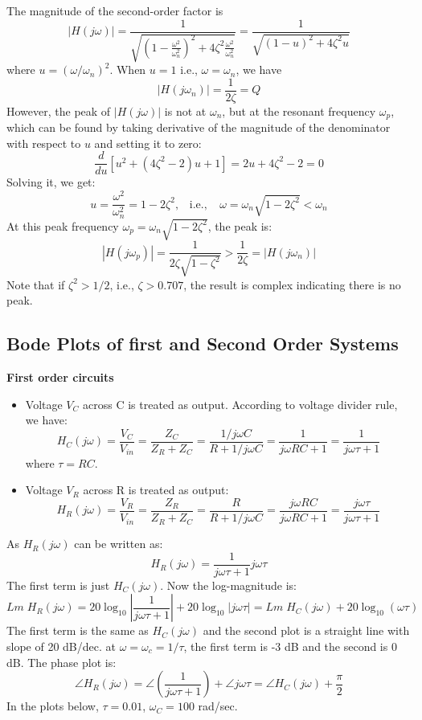 
  The magnitude of the second-order factor is
  \[ |H(j\omega)|
  =\frac{1}{\sqrt{(1-\frac{\omega^2}{\omega_n^2})^2+4\zeta^2 \frac{\omega^2}{\omega_n^2}}}
  =\frac{1}{\sqrt{(1-u)^2+4\zeta^2 u}} \]
  where $u=(\omega/\omega_n)^2$. When $u=1$ i.e., $\omega=\omega_n$, we have
  \[ | H(j\omega_n) |=\frac{1}{2\zeta}=Q \]
  However, the peak of $|H(j\omega)|$ is not at $\omega_n$, but at the resonant frequency 
  $\omega_p$, which can be found by taking derivative of the magnitude of the denominator 
  with respect to $u$ and setting it to zero:
  \[ \frac{d}{du}[u^2+(4\zeta^2-2)u+1]=2u+4\zeta^2-2=0 \]
  Solving it, we get:
  \[ u=\frac{\omega^2}{\omega_n^2}=1-2\zeta^2,\;\;\;\mbox{i.e.,}
  \;\;\;\;\omega=\omega_n\sqrt{1-2\zeta^2} < \omega_n \]
  At this peak frequency $\omega_p=\omega_n\sqrt{1-2\zeta^2}$, the peak is:
  \[ | H(j\omega_p) |=\frac{1}{2\zeta\sqrt{1-\zeta^2}} > \frac{1}{2\zeta}=| H(j\omega_n) | \]
  Note that if $\zeta^2>1/2$, i.e., $\zeta>0.707$, the result is complex indicating there 
  is no peak.


\subsection*{Bode Plots of first and Second Order Systems}
{\bf First order circuits}


\begin{itemize}
\item Voltage $V_C$ across C is treated as output. According to voltage
  divider rule, we have:
\[  H_C(j\omega)=\frac{V_C}{V_{in}}=\frac{Z_C}{Z_R+Z_C}
    =\frac{1/j\omega C}{R+1/j\omega C} 
    =\frac{1}{j\omega RC+1}=\frac{1}{j\omega \tau+1} \]
    where $\tau=RC$.
\item Voltage $V_R$ across R is treated as output:
  \[ H_R(j\omega)=\frac{V_R}{V_{in}}=\frac{Z_R}{Z_R+Z_C}
    =\frac{R}{R+1/j\omega C}=\frac{j\omega RC}{j\omega RC+1} 
    =\frac{j\omega \tau}{j\omega \tau+1} \]
\end{itemize}
As $H_R(j\omega)$ can be written as:
\[ H_R(j\omega)= \frac{1}{j\omega \tau+1} j\omega \tau  \]
The first term is just $H_C(j\omega)$. Now the log-magnitude is:
\[ Lm\;H_R(j\omega)
=20\log_{10} \left| \frac{1}{j\omega \tau+1}\right|+20\log_{10} \left| j\omega \tau \right| 
=Lm\; H_C(j\omega) +20\log_{10} (\omega\tau) \]
The first term is the same as $H_C(j\omega)$ and the second plot is a straight line
with slope of 20 dB/dec. at $\omega=\omega_c=1/\tau$, the first term is -3 dB and the  
second is 0 dB.  The phase plot is:
\[ \angle H_R(j\omega)=\angle \left(\frac{1}{j\omega \tau+1}\right)+\angle j\omega \tau  
=\angle H_C(j\omega)+\frac{\pi}{2} \]
In the plots below, $\tau=0.01$, $\omega_C=100$ rad/sec.

